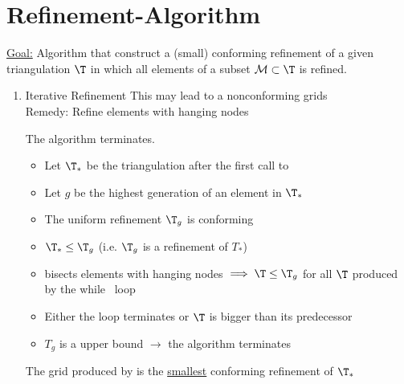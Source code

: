 \section{Refinement-Algorithm}
\underline{Goal:} Algorithm that construct a (small) conforming refinement of a given triangulation $\T$ in which all elements of a subset $\mathcal{M} \subset \T$ is refined.
\begin{enumerate}[label = \alph*)]
	\item Iterative Refinement
		This may lead to a nonconforming grids\\
		Remedy: Refine elements with hanging nodes
		\begin{lemma}
			The algorithm terminates.
			\begin{itemize}
				\item Let $\T_{*}$ be the triangulation after the first call to %
				\item Let $g$ be the highest generation of an element in $\T_{*}$ 
				\item The uniform refinement $\T_{g}$ is conforming
				\item $\T_{*}\leq \T_{g}$ (i.e. $\T_{g}$ is a refinement of $T_{*}$)
				\item %
					bisects elements with hanging nodes $\implies \T \leq \T_{g}$ for all $\T$ produced by the \glqq while \grqq\ loop
				\item Either the loop terminates or $\T$ is bigger than its predecessor
				\item $T_{g}$ is a upper bound $\to$ the algorithm terminates
			\end{itemize}
		\end{lemma}
		\begin{lemma}
			The grid produced by %
			is the \underline{smallest} conforming refinement of $\T_{*}$
		\end{lemma}

\end{enumerate}
